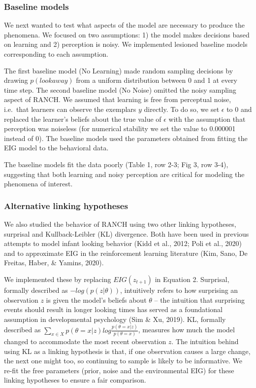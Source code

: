 \documentclass[
  man,floatsintext]{apa6}
\begin{document}
\hypertarget{baseline-models}{%
\subsubsection{Baseline models}\label{baseline-models}}

We next wanted to test what aspects of the model are necessary to produce the phenomena. We focused on two assumptions: 1) the model makes decisions based on learning and 2) perception is noisy. We implemented lesioned baseline models corresponding to each assumption.

The first baseline model (No Learning) made random sampling decisions by drawing \(p(look away)\) from a uniform distribution between 0 and 1 at every time step. The second baseline model (No Noise) omitted the noisy sampling aspect of RANCH. We assumed that learning is free from perceptual noise, i.e.~that learners can observe the exemplars \(y\) directly. To do so, we set \(\epsilon\) to 0 and replaced the learner's beliefs about the true value of \(\epsilon\) with the assumption that perception was noiseless (for numerical stability we set the value to 0.000001 instead of 0). The baseline models used the parameters obtained from fitting the EIG model to the behavioral data.

The baseline models fit the data poorly (Table 1, row 2-3; Fig 3, row 3-4), suggesting that both learning and noisy perception are critical for modeling the phenomena of interest.

\hypertarget{alternative-linking-hypotheses}{%
\subsubsection{Alternative linking hypotheses}\label{alternative-linking-hypotheses}}

We also studied the behavior of RANCH using two other linking hypotheses, surprisal and Kullback-Leibler (KL) divergence. Both have been used in previous attempts to model infant looking behavior (Kidd et al., 2012; Poli et al., 2020) and to approximate EIG in the reinforcement learning literature (Kim, Sano, De Freitas, Haber, \& Yamins, 2020).

We implemented these by replacing \(EIG(z_{t+1})\) in Equation 2. Surprisal, formally described as \(-log(p(z|\theta))\), intuitively refers to how surprising an observation \(z\) is given the model's beliefs about \(\theta\) -- the intuition that surprising events should result in longer looking times has served as a foundational assumption in developmental psychology (Sim \& Xu, 2019). KL, formally described as \(\sum_{x \in X}{p(\theta = x|z) log \frac{p(\theta = x|z)}{p(\theta = x)}}\), measures how much the model changed to accommodate the most recent observation \(z\). The intuition behind using KL as a linking hypothesis is that, if one observation causes a large change, the next one might too, so continuing to sample is likely to be informative. We re-fit the free parameters (prior, noise and the environmental EIG) for these linking hypotheses to ensure a fair comparison.
\end{document}

